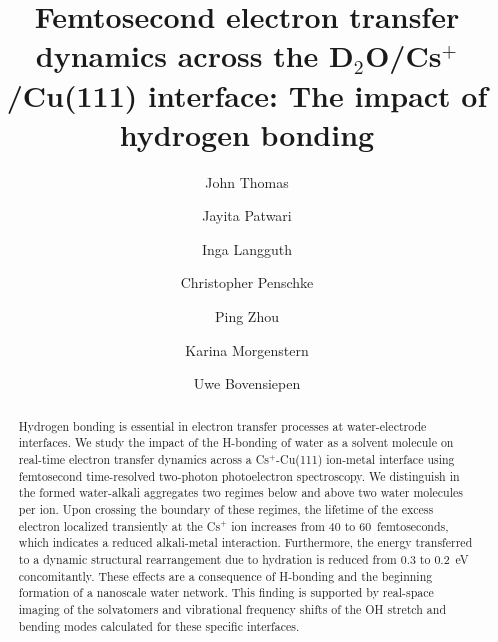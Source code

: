 \documentclass[aps,twocolumn,amssymb,amsfonts,amsmath,showpacs,final,a4paper,superscriptaddress]{revtex4-2}
\begin{document}
\title{Femtosecond electron transfer dynamics across the D$_2$O/Cs$^+$/Cu(111) interface: The impact of hydrogen bonding}

\author{John Thomas}

\author{Jayita Patwari}

\author{Inga Langguth}

\author{Christopher Penschke}

\author{Ping Zhou}

\author {Karina Morgenstern}

\author{Uwe Bovensiepen}





\begin{abstract}
Hydrogen bonding is essential in electron transfer processes at water-electrode interfaces. We study the impact of the H-bonding of water as a solvent molecule on real-time electron transfer dynamics across a Cs$^+$-Cu(111) ion-metal interface using femtosecond time-resolved two-photon photoelectron spectroscopy. We distinguish in the formed water-alkali aggregates two regimes below and above two water molecules per ion. Upon crossing the boundary of these regimes, the lifetime of the excess electron localized transiently at the Cs$^+$ ion increases from 40 to 60~femtoseconds, which indicates a reduced alkali-metal interaction. Furthermore, the energy transferred to a dynamic structural rearrangement due to hydration is reduced from 0.3 to 0.2~eV concomitantly. These effects are a consequence of H-bonding and the beginning formation of a nanoscale water network. This finding is supported by real-space imaging of the solvatomers and vibrational frequency shifts of the OH stretch and bending modes calculated for these specific interfaces.
\end{abstract}
\end{document}
